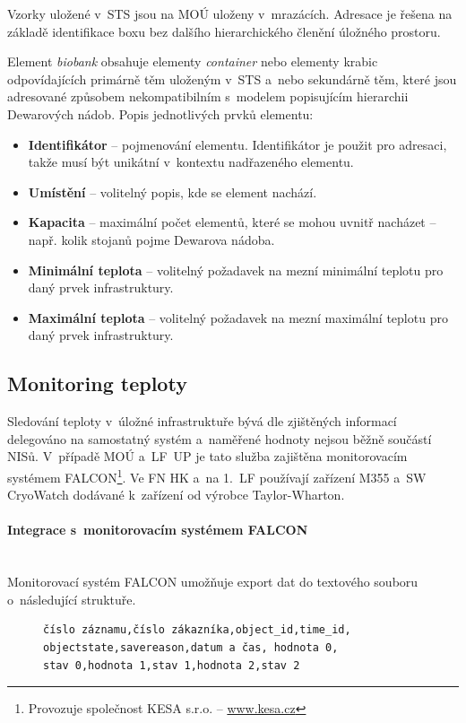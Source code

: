 \documentclass[11pt, final, oneside]{fithesis2}
\newcommand{\polozka}[1]{\item {\bf #1}\xspace}
\newcommand{\paragraphNewLine}[1]{\paragraph*{#1}\mbox{}\\}
\begin{document}
Vzorky uložené v~STS jsou na MOÚ uloženy v~mrazácích. Adresace je řešena na základě identifikace boxu bez dalšího hierarchického členění úložného prostoru.

Element \textit{biobank} obsahuje elementy \textit{container} nebo elementy  krabic odpovídajících primárně těm uloženým v~STS a~nebo sekundárně těm, které jsou adresované způsobem nekompatibilním s~modelem popisujícím hierarchii Dewarových nádob. Popis jednotlivých prvků elementu:

\begin{itemize}

\polozka{{Identifikátor}} -- pojmenování elementu. Identifikátor je použit pro adresaci, takže musí být unikátní v~kontextu nadřazeného elementu.

\polozka{{Umístění}} -- volitelný popis, kde se element nachází.

\polozka{{Kapacita}} -- maximální počet elementů, které se mohou uvnitř nacházet -- např. kolik stojanů pojme Dewarova nádoba.

\polozka{{Minimální teplota}} -- volitelný požadavek na mezní minimální teplotu pro daný prvek infrastruktury.

\polozka{{Maximální teplota}} -- volitelný požadavek na mezní maximální teplotu pro daný prvek infrastruktury.

\end{itemize}

\subsection{Monitoring teploty}
Sledování teploty v~úložné infrastruktuře bývá dle zjištěných informací delegováno na samostatný systém a~naměřené hodnoty nejsou běžně součástí NISů. 
V~případě MOÚ a~LF~UP je tato služba zajištěna monitorovacím systémem FALCON\footnote{Provozuje společnost KESA s.r.o. -- \url{www.kesa.cz}}. Ve FN HK a~na 1.~LF používají zařízení M355 a~SW CryoWatch dodávané k~zařízení od výrobce Taylor-Wharton. 

\paragraphNewLine{Integrace s~monitorovacím systémem FALCON}
Monitorovací systém FALCON umožňuje export dat do textového souboru o~následující struktuře.

\begin{figure}[ht!]
\centering
\begin{BVerbatim}
číslo záznamu,číslo zákazníka,object_id,time_id,
objectstate,savereason,datum a čas, hodnota 0,
stav 0,hodnota 1,stav 1,hodnota 2,stav 2
\end{BVerbatim}
\end{figure}
\end{document}
